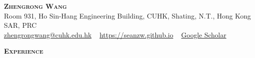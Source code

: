 \documentclass[a4paper]{article}
\def\justifying{%
  \rightskip=0pt
  \spaceskip=0pt
  \xspaceskip=0pt
  \relax
}
\newenvironment{changemargin}[2]{%
  \begin{list}{}{%
    \setlength{\topsep}{0pt}%
    \setlength{\leftmargin}{#1}%
    \setlength{\rightmargin}{#2}%
    \setlength{\listparindent}{\parindent}%
    \setlength{\itemindent}{\parindent}%
    \setlength{\parsep}{\parskip}%
  }%
  \item[]}{\end{list}
}
\newcommand{\lineover}{
	\begin{changemargin}{-0.05in}{-0.05in}
		\vspace*{-8pt}
		\hrulefill \\
		\vspace*{-2pt}
	\end{changemargin}
}
\newcommand{\header}[1]{
	\begin{changemargin}{-0.5in}{-0.5in}
		\scshape{\large \textbf{#1}}\\
  	\lineover
	\end{changemargin}
}
\newcommand{\contact}[4]{
	\begin{changemargin}{-0.5in}{-0.5in}
		\begin{center}
			{\LARGE \scshape \textbf{#1}}\\ \smallskip
			Room 931, Ho Sin-Hang Engineering Building, CUHK, Shating, N.T., Hong Kong SAR, PRC\\ \smallskip
			{\href{#2}{#2}} ~ \smallskip 
			{\href{#3}{#3}} ~
			{\href{#4}{Google Scholar}}\smallskip
		\end{center}
	\end{changemargin}
}
\newenvironment{body} {
	\vspace*{-16pt}
	\begin{changemargin}{-0.5in}{-0.5in}
  }	
	{\end{changemargin}
}
\begin{document}
\contact{Zhengrong Wang}{zhengrongwang@cuhk.edu.hk}{https://seanzw.github.io}{https://scholar.google.com/citations?user=h\_GwGfQAAAAJ\&hl=en}


	





\header{Experience}
\end{document}
